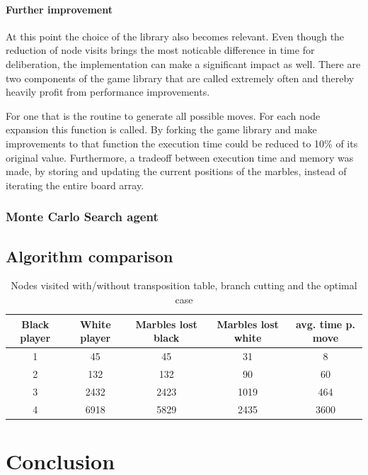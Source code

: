 \documentclass{llncs}
\begin{document}
\paragraph{Further improvement}
At this point the choice of the library also becomes relevant. Even though the reduction of node visits brings the most noticable difference in time for deliberation, the implementation can make a significant impact as well. There are two components of the game library that are called extremely often and thereby heavily profit from performance improvements.

For one that is the routine to generate all possible moves. For each node expansion this function is called. By forking the game library \cite{campfireman_campfiremanabalone-boai_2021} and make improvements to that function the execution time could be reduced to 10\% of its original value. Furthermore, a tradeoff between execution time and memory was made, by storing and updating the current positions of the marbles, instead of iterating the entire board array.

\subsubsection{Monte Carlo Search agent}

\subsection{Algorithm comparison}


\begin{table}
  \begin{center}
    \begin{tabular}{ | c | c | c | c | c | }
      \hline
      Black player & White player & Marbles lost black & Marbles lost white & avg. time p. move \\
      \hline
      1            & 45           & 45                 & 31                 & 8                 \\
      \hline
      2            & 132          & 132                & 90                 & 60                \\
      \hline
      3            & 2432         & 2423               & 1019               & 464               \\
      \hline
      4            & 6918         & 5829               & 2435               & 3600              \\
      \hline
    \end{tabular}
  \end{center}
  \caption{Nodes visited with/without transposition table, branch cutting and the optimal case}
  \label{node_count}
\end{table}



\section{Conclusion}



\end{document}
